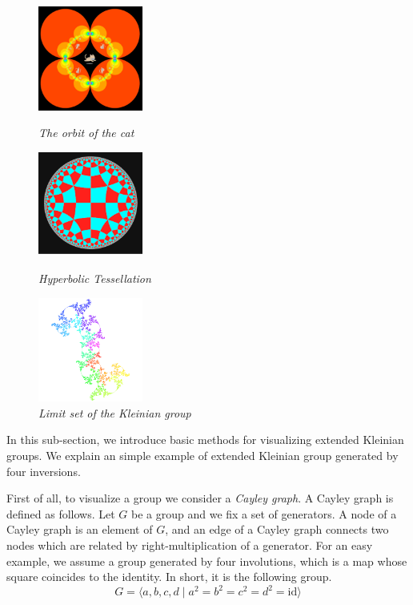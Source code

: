 \begin{figure}[htbp]
 \begin{minipage}[t]{0.3333\hsize}
  \center
  \includegraphics[height=1.35in, keepaspectratio]{img/preparation/basic/catCircleOrbit.png}
  \caption{\textit{The orbit of the cat}}
  \label{fig:orbitCat}
  \hspace*{\fill}
 \end{minipage}
 \begin{minipage}[t]{0.3333\hsize}
  \center
  \includegraphics[height=1.35in, keepaspectratio]{img/preparation/basic/hyperbolicTessellation.png}
  \caption{\textit{Hyperbolic Tessellation}}
  \label{fig:hypTiling}
  \hspace*{\fill}
 \end{minipage}
 \begin{minipage}[t]{0.3333\hsize}
  \center
  \includegraphics[height=1.35in, keepaspectratio]{img/preparation/limitSet/limit.png}
  \caption{\textit{Limit set of the Kleinian group}}
  \label{fig:limit}
  \hspace*{\fill}
 \end{minipage}
\end{figure}

\noindent In this sub-section, we introduce basic methods for
visualizing extended Kleinian groups.
We explain an simple example of extended Kleinian group generated by
four inversions.

First of all, to visualize a group we consider a \textit{Cayley graph}.
A Cayley graph is defined as follows. Let $G$ be a group and we fix a
set of generators.
A node of a Cayley graph is an element of $G$, and an edge of a Cayley
graph connects two nodes which are related by right-multiplication of a
generator.
For an easy example, we assume a group generated by four
involutions, which is a map whose square coincides to the identity.
In short, it is the following group.
\[ G=\langle a,b,c,d \mid a^2=b^2=c^2=d^2 = \mathrm{id} \rangle \]

